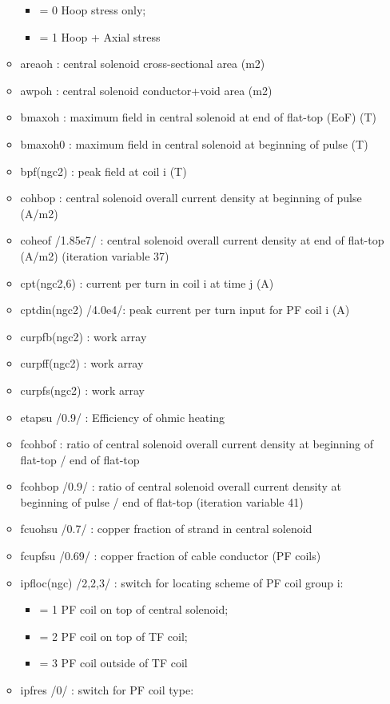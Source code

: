 \documentclass[
]{article}
\providecommand{\tightlist}{%
  \setlength{\itemsep}{0pt}\setlength{\parskip}{0pt}}
\begin{document}
\begin{itemize}
\begin{itemize}
    \begin{itemize}
    \tightlist
    \item
      = 0 Hoop stress only;
    \item
      = 1 Hoop + Axial stress
    \end{itemize}
  \item
    areaoh : central solenoid cross-sectional area (m2)
  \item
    awpoh : central solenoid conductor+void area (m2)
  \item
    bmaxoh : maximum field in central solenoid at end of flat-top (EoF)
    (T)
  \item
    bmaxoh0 : maximum field in central solenoid at beginning of pulse
    (T)
  \item
    bpf(ngc2) : peak field at coil i (T)
  \item
    cohbop : central solenoid overall current density at beginning of
    pulse (A/m2)
  \item
    coheof /1.85e7/ : central solenoid overall current density at end of
    flat-top (A/m2) (iteration variable 37)
  \item
    cpt(ngc2,6) : current per turn in coil i at time j (A)
  \item
    cptdin(ngc2) /4.0e4/: peak current per turn input for PF coil i (A)
  \item
    curpfb(ngc2) : work array
  \item
    curpff(ngc2) : work array
  \item
    curpfs(ngc2) : work array
  \item
    etapsu /0.9/ : Efficiency of ohmic heating
  \item
    fcohbof : ratio of central solenoid overall current density at
    beginning of flat-top / end of flat-top
  \item
    fcohbop /0.9/ : ratio of central solenoid overall current density at
    beginning of pulse / end of flat-top (iteration variable 41)
  \item
    fcuohsu /0.7/ : copper fraction of strand in central solenoid
  \item
    fcupfsu /0.69/ : copper fraction of cable conductor (PF coils)
  \item
    ipfloc(ngc) /2,2,3/ : switch for locating scheme of PF coil group i:

    \begin{itemize}
    \tightlist
    \item
      = 1 PF coil on top of central solenoid;
    \item
      = 2 PF coil on top of TF coil;
    \item
      = 3 PF coil outside of TF coil
    \end{itemize}
  \item
    ipfres /0/ : switch for PF coil type:


\end{itemize}
\end{itemize}
\end{document}
